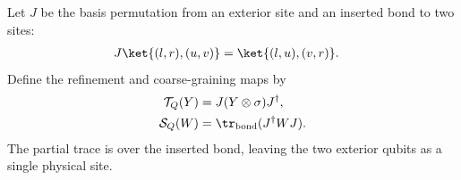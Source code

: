 

\begin{definition}%
    \label{def:mpdo_twisted_dimer_bond_channels}
    \leanok
    Let $J$ be the basis permutation from an exterior site and an
    inserted bond to two sites:
    \begin{align}
        J\ket{(l,r),(u,v)} & =\ket{(l,u),(v,r)}.
        \notag
    \end{align}
    Define the refinement and coarse-graining maps by
    \begin{align}
        \mathcal T_Q(Y) & =J(Y\otimes\sigma)J^\dagger,
        \notag                                                \\
        \mathcal S_Q(W) & =\tr_{\mathrm{bond}}(J^\dagger WJ).
        \notag
    \end{align}
    The partial trace is over the inserted bond, leaving the two
    exterior qubits as a single physical site.
\end{definition}

